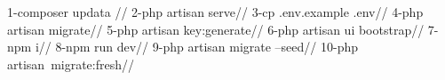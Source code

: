 1-composer updata //
2-php artisan serve//
3-cp .env.example .env//
4-php artisan migrate//
5-php artisan key:generate//
6-php artisan ui bootstrap//
7-npm i//
8-npm run dev//
9-php artisan migrate --seed//
10-php artisan migrate:fresh//